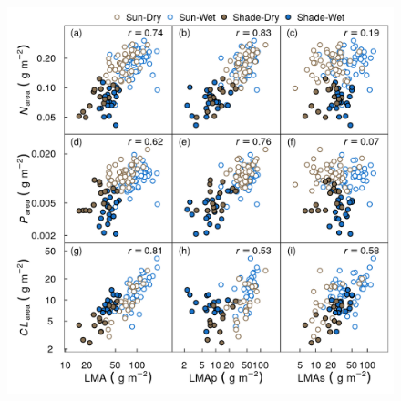 \documentclass[
  12pt,
  a4paper,
,tablecaptionabove
]{scrartcl}
\providecommand{\DIFaddbeginFL}{} %
\providecommand{\DIFdelbeginFL}{} %
\providecommand{\DIFdelendFL}{} %
\newcommand{\DIFscaledelfig}{0.5}
\newlength{\DIFdelgraphicswidth} %
\newlength{\DIFdelgraphicsheight} %
\newcommand{\DIFaddincludegraphics}[2][]{{\color{blue}\fbox{\DIFOincludegraphics[#1]{#2}}}} %
\newcommand{\DIFdelincludegraphics}[2][]{%
\sbox{\DIFdelgraphicsbox}{\DIFOincludegraphics[#1]{#2}}%
\settoboxwidth{\DIFdelgraphicswidth}{\DIFdelgraphicsbox} %
\settoboxtotalheight{\DIFdelgraphicsheight}{\DIFdelgraphicsbox} %
\scalebox{\DIFscaledelfig}{%
\parbox[b]{\DIFdelgraphicswidth}{\usebox{\DIFdelgraphicsbox}\\[-\baselineskip] \rule{\DIFdelgraphicswidth}{0em}}\llap{\resizebox{\DIFdelgraphicswidth}{\DIFdelgraphicsheight}{%
\setlength{\unitlength}{\DIFdelgraphicswidth}%
\begin{picture}(1,1)%
\thicklines\linethickness{2pt} %
{\color[rgb]{1,0,0}\put(0,0){\framebox(1,1){}}}%
{\color[rgb]{1,0,0}\put(0,0){\line( 1,1){1}}}%
{\color[rgb]{1,0,0}\put(0,1){\line(1,-1){1}}}%
\end{picture}%
}\hspace*{3pt}}} %
} %
\DeclareRobustCommand{\DIFaddbeginFL}{\DIFOaddbeginFL \let\includegraphics\DIFaddincludegraphics} %
\DeclareRobustCommand{\DIFdelbeginFL}{\DIFOdelbeginFL \let\includegraphics\DIFdelincludegraphics} %
\DeclareRobustCommand{\DIFdelendFL}{\DIFOaddendFL \let\includegraphics\DIFOincludegraphics} %
\begin{document}
\begin{figure}
\DIFdelbeginFL %
\DIFdelendFL \DIFaddbeginFL 

{\centering \includegraphics{../figs/pa_point_npc.png}

}
\end{figure}
\end{document}
